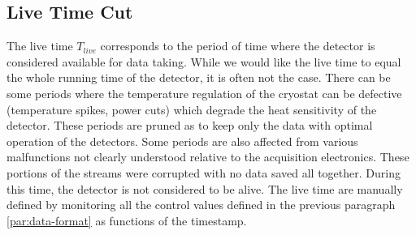 

\subsection{Live Time Cut}
\label{par:live-time-cut}

%
%
%

The live time $T_{live}$ corresponds to the period of time where the detector is considered available for data taking. While we would like the live time to equal the whole running time of the detector, it is often not the case. There can be some periods where the temperature regulation of the cryostat can be defective (temperature spikes, power cuts) which degrade the heat sensitivity of the detector. These periods are pruned as to keep only the data with optimal operation of the detectors. Some periods are also affected from various malfunctions not clearly understood relative to the acquisition electronics. These portions of the streams were corrupted with no data saved all together. During this time, the detector is not considered to be alive. The live time are manually defined by monitoring all the control values defined in the previous paragraph \ref{par:data-format} as functions of the timestamp.

